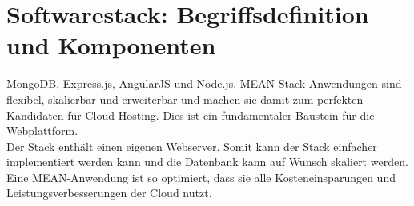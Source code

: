 \label{sec:softwarestack-begriffsdefinition}
\section{Softwarestack: Begriffsdefinition und Komponenten}
MongoDB, Express.js, AngularJS und Node.js. MEAN-Stack-Anwendungen sind flexibel, skalierbar und erweiterbar und machen sie damit zum perfekten Kandidaten für Cloud-Hosting. Dies ist ein fundamentaler Baustein für die Webplattform.\\ 
Der Stack enthält einen eigenen Webserver. Somit kann der Stack einfacher implementiert werden kann und die Datenbank kann auf Wunsch skaliert werden. Eine MEAN-Anwendung ist so optimiert, dass sie alle Kosteneinsparungen und Leistungsverbesserungen der Cloud nutzt.

